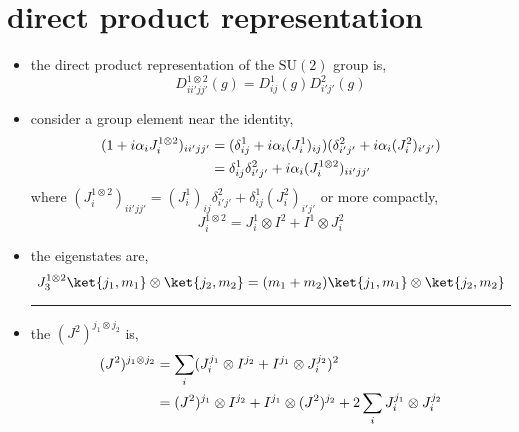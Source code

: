 \section{direct product representation}
\begin{itemize}
	\item the direct product representation of the $\mathrm{SU}(2)$ group is,
	\begin{equation}
		D^{1 \otimes 2}_{i i' j j'}(g) = D^1_{i j}(g) D^2_{i' j'}(g)
	\end{equation}
	
	\item consider a group element near the identity,
	\begin{align}
		(1 + i \alpha_i J^{1 \otimes 2}_i)_{i i' j j'} &= (\delta^1_{i j} + i \alpha_i (J^1_i)_{i j}) (\delta^2_{i' j'} + i \alpha_i (J^2_i)_{i' j'}) \notag \\
		&= \delta^1_{i j} \delta^2_{i' j'} + i \alpha_i (J^{1 \otimes 2}_i)_{i i' j j'}
	\end{align}
	where $(J^{1 \otimes 2}_i)_{i i' j j'} = (J^1_i)_{i j} \delta^2_{i' j'} + \delta^1_{i j} (J^2_i)_{i' j'}$ or more compactly,
	\begin{equation}
		J^{1 \otimes 2}_i = J^1_i \otimes I^2 + I^1 \otimes J^2_i
	\end{equation}
	
	\item the eigenstates are,
	\begin{equation}
		J^{1 \otimes 2}_3 \ket{j_1, m_1} \otimes \ket{j_2, m_2} = (m_1 + m_2) \ket{j_1, m_1} \otimes \ket{j_2, m_2}
	\end{equation}
	
	\noindent\rule[0.5ex]{\linewidth}{0.5pt} %
	
	\item the $(J^2)^{j_1 \otimes j_2}$ is,
	\begin{align}
		(J^2)^{j_1 \otimes j_2} &= \sum_i (J^{j_1}_i \otimes I^{j_2} + I^{j_1} \otimes J^{j_2}_i)^2 \notag \\
		&= (J^2)^{j_1} \otimes I^{j_2} + I^{j_1} \otimes (J^2)^{j_2} + 2 \sum_i J^{j_1}_i \otimes J^{j_2}_i
	\end{align}
	

\end{itemize}
